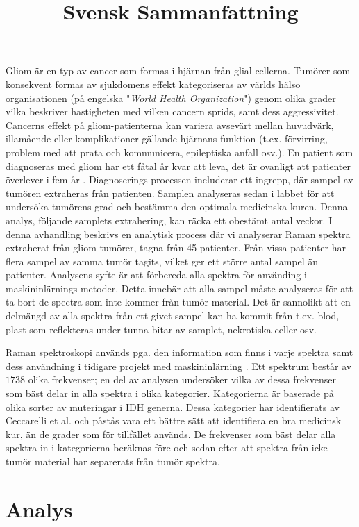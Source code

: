 \title{Svensk Sammanfattning}

Gliom är en typ av cancer som formas i hjärnan från glial cellerna. Tumörer som konsekvent formas av sjukdomens effekt kategoriseras av världs hälso organisationen (på engelska "\textit{World Health Organization}") genom olika grader vilka beskriver hastigheten med vilken cancern sprids, samt dess aggressivitet. Cancerns effekt på gliom-patienterna kan variera avsevärt mellan huvudvärk, illamående eller komplikationer gällande hjärnans funktion (t.ex. förvirring, problem med att prata och kommunicera, epileptiska anfall osv.). En patient som diagnoseras med gliom har ett fåtal år kvar att leva, det är ovanligt att patienter överlever i fem år \cite{glialcells, gallego2015nonsurgical, bleeker2012recent}. Diagnoserings processen includerar ett ingrepp, där sampel av tumören extraheras från patienten. Samplen analyseras sedan i labbet för att undersöka tumörens grad och bestämma den optimala medicinska kuren. Denna analys, följande samplets extrahering, kan räcka ett obestämt antal veckor. I denna avhandling beskrivs en analytisk process där vi analyserar Raman spektra extraherat från gliom tumörer, tagna från 45 patienter. Från vissa patienter har flera sampel av samma tumör tagits, vilket ger ett större antal sampel än patienter. Analysens syfte är att förbereda alla spektra för använding i maskininlärnings metoder. Detta innebär att alla sampel måste analyseras för att ta bort de spectra som inte kommer från tumör material. Det är sannolikt att en delmängd av alla spektra från ett givet sampel kan ha kommit från t.ex. blod, plast som reflekteras under tunna bitar av samplet, nekrotiska celler osv.

Raman spektroskopi används pga. den information som finns i varje spektra samt dess användning i tidigare projekt med maskininlärning \cite{ramanDL, ho2019rapid}. Ett spektrum består av $1738$ olika frekvenser; en del av analysen undersöker vilka av dessa frekvenser som bäst delar in alla spektra i olika kategorier. Kategorierna är baserade på olika sorter av muteringar i IDH generna. Dessa kategorier har identifierats av Ceccarelli et al. \cite{cellsubsets} och påstås vara ett bättre sätt att identifiera en bra medicinsk kur, än de grader som för tillfället används. De frekvenser som bäst delar alla spektra in i kategorierna beräknas före och sedan efter att spektra från icke-tumör material har separerats från tumör spektra.

\section*{Analys}

